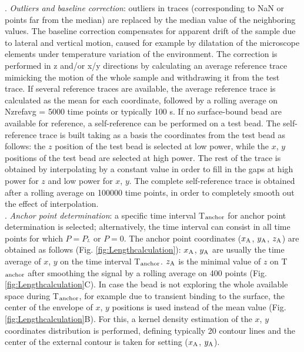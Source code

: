 \documentclass{biophys-new}
\begin{document}
.\textit{ Outliers and baseline correction}: outliers in traces (corresponding to NaN or points far from the median) are replaced by the median value of the neighboring values. The baseline correction compensates for apparent drift of the sample due to lateral and vertical motion, caused for example by dilatation of the microscope elements under temperature variation of the environment. The correction is performed in z and/or x/y directions by calculating an average reference trace mimicking the motion of the whole sample and withdrawing it from the test trace. If several reference traces are available, the average reference trace is calculated as the mean for each coordinate, followed by a rolling average on Nzrefavg = 5000 time points or typically 100 s. If no surface-bound bead are available for reference, a self-reference can be performed on a test bead. The self-reference trace is built taking as a basis the coordinates from the test bead as follows: the $z$ position of the test bead is selected at low power, while the $x$, $y$ positions of the test bead are selected at high power. %
The rest of the trace is obtained by interpolating by a constant value in order to fill in the gaps at high power for $z$ and low power for $x$, $y$. The complete self-reference trace is obtained after a rolling average on 100000 time points, in order to completely smooth out the effect of interpolation.\\

. \textit{ Anchor point determination}: a specific time interval T$_{\rm anchor}$ for anchor point determination is selected; alternatively, the time interval can consist in all time points for which $P=P_{^L}$ or $P=0$. The anchor point coordinates ($x_{\rm A}$, $y_{\rm A}$, $z_{\rm A}$) are obtained as follows (Fig. \ref{fig:Lengthcalculation}): $x_{\rm A}$, $y_{\rm A}$ are usually the time average of $x$, $y$ on the time interval T$_{\rm anchor}$. $z_{\rm A}$ is the minimal value of $z$ on T$_{\rm anchor}$ after smoothing the signal by a rolling average on 400 points (Fig. \ref{fig:Lengthcalculation}C). In case the bead is not exploring the whole available space during T$_{\rm anchor}$, for example due to transient binding to the surface, the center of the envelope of $x$, $y$ positions is used instead of the mean value (Fig. \ref{fig:Lengthcalculation}B). For this, a kernel density estimation of the $x$, $y$ coordinates distribution is performed, defining typically 20 contour lines and the center of the external contour is taken for setting ($x_{\rm A}$, $y_{\rm A}$).\\
\end{document}
